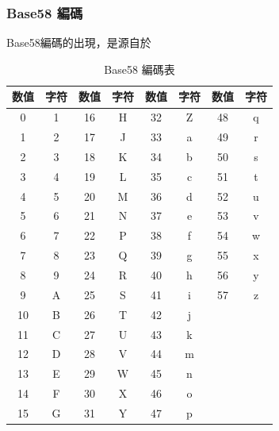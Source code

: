 				\subsubsection{Base58 編碼}
				Base58編碼的出現，是源自於
					\begin{table}[htbp]
					\centering
					\caption{Base58 編碼表}
					\label{Base58}
					\begin{tabular}{|c|c|c|c|c|c|c|c|}
					\hline
					数值 & 字符 & 数值 & 字符 & 数值 & 字符 & 数值 & 字符 \\ \hline
					0 & 1 & 16 & H & 32 & Z & 48 & q \\ \hline
					1 & 2 & 17 & J & 33 & a & 49 & r \\ \hline
					2 & 3 & 18 & K & 34 & b & 50 & s \\ \hline
					3 & 4 & 19 & L & 35 & c & 51 & t \\ \hline
					4 & 5 & 20 & M & 36 & d & 52 & u \\ \hline
					5 & 6 & 21 & N & 37 & e & 53 & v \\ \hline
					6 & 7 & 22 & P & 38 & f & 54 & w \\ \hline
					7 & 8 & 23 & Q & 39 & g & 55 & x \\ \hline
					8 & 9 & 24 & R & 40 & h & 56 & y \\ \hline
					9 & A & 25 & S & 41 & i & 57 & z \\ \hline
					10 & B & 26 & T & 42 & j &  &  \\ \hline
					11 & C & 27 & U & 43 & k &  &  \\ \hline
					12 & D & 28 & V & 44 & m &  &  \\ \hline
					13 & E & 29 & W & 45 & n &  &  \\ \hline
					14 & F & 30 & X & 46 & o &  &  \\ \hline
					15 & G & 31 & Y & 47 & p &  &  \\ \hline
					\end{tabular}
					\end{table}


